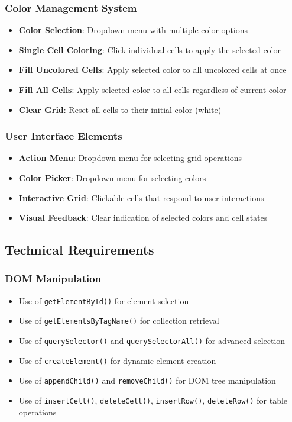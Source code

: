 \documentclass[11pt,a4paper]{article}
\begin{document}
\subsubsection{Color Management System}
\begin{itemize}[leftmargin=*]
    \item \textbf{Color Selection}: Dropdown menu with multiple color options
    \item \textbf{Single Cell Coloring}: Click individual cells to apply the selected color
    \item \textbf{Fill Uncolored Cells}: Apply selected color to all uncolored cells at once
    \item \textbf{Fill All Cells}: Apply selected color to all cells regardless of current color
    \item \textbf{Clear Grid}: Reset all cells to their initial color (white)
\end{itemize}

\subsubsection{User Interface Elements}
\begin{itemize}[leftmargin=*]
    \item \textbf{Action Menu}: Dropdown menu for selecting grid operations
    \item \textbf{Color Picker}: Dropdown menu for selecting colors
    \item \textbf{Interactive Grid}: Clickable cells that respond to user interactions
    \item \textbf{Visual Feedback}: Clear indication of selected colors and cell states
\end{itemize}

\subsection{Technical Requirements}

\subsubsection{DOM Manipulation}
\begin{itemize}[leftmargin=*]
    \item Use of \texttt{getElementById()} for element selection
    \item Use of \texttt{getElementsByTagName()} for collection retrieval
    \item Use of \texttt{querySelector()} and \texttt{querySelectorAll()} for advanced selection
    \item Use of \texttt{createElement()} for dynamic element creation
    \item Use of \texttt{appendChild()} and \texttt{removeChild()} for DOM tree manipulation
    \item Use of \texttt{insertCell()}, \texttt{deleteCell()}, \texttt{insertRow()}, \texttt{deleteRow()} for table operations
\end{itemize}
\end{document}
